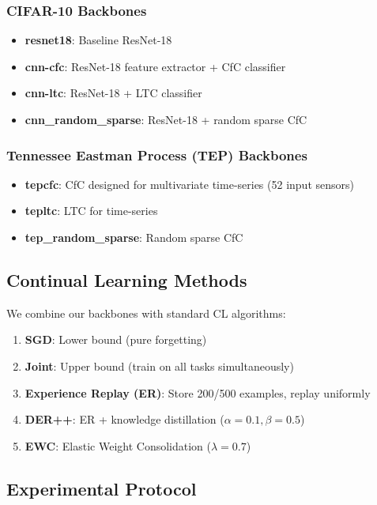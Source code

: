 \documentclass[11pt,twocolumn]{article}
\begin{document}
\subsubsection{CIFAR-10 Backbones}

\begin{itemize}
    \item \textbf{resnet18}: Baseline ResNet-18
    \item \textbf{cnn-cfc}: ResNet-18 feature extractor + CfC classifier
    \item \textbf{cnn-ltc}: ResNet-18 + LTC classifier
    \item \textbf{cnn\_random\_sparse}: ResNet-18 + random sparse CfC
\end{itemize}

\subsubsection{Tennessee Eastman Process (TEP) Backbones}

\begin{itemize}
    \item \textbf{tepcfc}: CfC designed for multivariate time-series (52 input sensors)
    \item \textbf{tepltc}: LTC for time-series
    \item \textbf{tep\_random\_sparse}: Random sparse CfC
\end{itemize}

\subsection{Continual Learning Methods}

We combine our backbones with standard CL algorithms:

\begin{enumerate}
    \item \textbf{SGD}: Lower bound (pure forgetting)
    \item \textbf{Joint}: Upper bound (train on all tasks simultaneously)
    \item \textbf{Experience Replay (ER)}: Store 200/500 examples, replay uniformly
    \item \textbf{DER++}: ER + knowledge distillation ($\alpha=0.1, \beta=0.5$)
    \item \textbf{EWC}: Elastic Weight Consolidation ($\lambda=0.7$)
\end{enumerate}

\subsection{Experimental Protocol}
\end{document}
